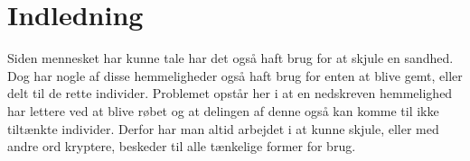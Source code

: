 \section{Indledning}
Siden mennesket har kunne tale har det også haft brug for at skjule en sandhed. Dog har nogle af disse hemmeligheder også haft brug for enten at blive gemt, eller delt til de rette individer. Problemet opstår her i at en nedskreven hemmelighed har lettere ved at blive røbet og at delingen af denne også kan komme til ikke tiltænkte individer.
Derfor har man altid arbejdet i at kunne skjule, eller med andre ord kryptere, beskeder til alle tænkelige former for brug.